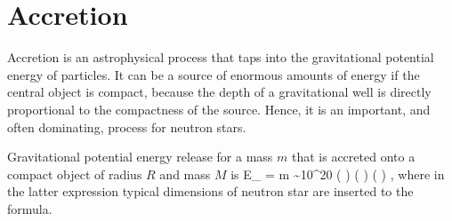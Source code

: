  
 
 




\section{Accretion}

Accretion is an astrophysical process that taps into the gravitational potential energy of particles.
It can be a source of enormous amounts of energy if the central object is compact, because the depth of a gravitational well is directly proportional to the compactness of the source.
Hence, it is an important, and often dominating, process for neutron stars.\cite[For an introduction, see e.g., ][]{FKR02}

Gravitational potential energy release for a mass $m$ that is accreted onto a compact object of radius $R$ and mass $M$ is
\be
\Delta E_{} = m  \sim 10^{20} \left(  \right) \left(  \right) \left(  \right) \erg,
\ee
where in the latter expression typical dimensions of neutron star are inserted to the formula.

